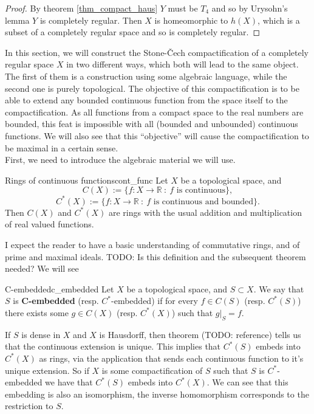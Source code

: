 \documentclass[a4paper]{book}
\theoremstyle{definition}
\theoremstyle{ejemplo}
\theoremstyle{demostracion}
\newcommand{\reales}{\mathbb{R}}
\begin{document}
\begin{proof}
	By theorem \eqref{thm_compact_haus} $Y$ must be $T_4$ and so by Urysohn's lemma $Y$ is completely regular. Then $X$ is homeomorphic to $h(X)$, which is a subset of a completely regular space and so is completely regular.
\end{proof}

In this section, we will construct the Stone-Čech compactification of a completely regular space $X$ in two different ways, which both will lead to the same object. The first of them is a construction using some algebraic language, while the second one is purely topological. The objective of this compactification is to be able to extend any bounded continuous function from the space itself to the compactification. As all functions from a compact space to the real numbers are bounded, this feat is impossible with all (bounded and unbounded) continuous functions. We will also see that this ``objective'' will cause the compactification to be maximal in a certain sense.\\ 
First, we need to introduce the algebraic material we will use.

\begin{define}{Rings of continuous functions}{cont_func}
	Let $X$ be a topological space, and 
	\begin{equation*}
		C(X) := \{ f: X \rightarrow \reales\ :\ f \text{ is continuous} \},
	\end{equation*}
	\begin{equation*}
		C^*(X) := \{ f: X \rightarrow \reales\ :\ f \text{ is continuous and bounded} \}.
	\end{equation*}
	Then $C(X)$ and $C^*(X)$ are rings with the usual addition and multiplication of real valued functions.
\end{define}

I expect the reader to have a basic understanding of commutative rings, and of prime and maximal ideals.
TODO: Is this definition and the subsequent theorem needed? We will see

\begin{define}{C-embedded}{c_embedded}
	Let $X$ be a topological space, and $S \subset X$. We say that $S$ is \textbf{C-embedded} (resp. $C^*$-embedded) if for every $f \in C(S)$ (resp. $C^*(S)$) there exists some $g \in C(X)$ (resp. $C^*(X)$) such that $g|_S = f$.
\end{define}

If $S$ is dense in $X$ and $X$ is Hausdorff, then theorem (TODO: reference) tells us that the continuous extension is unique. This implies that $C^*(S)$ embeds into $C^*(X)$ as rings, via the application that sends each continuous function to it's unique extension. So if $X$ is some compactification of $S$ such that $S$ is $C^*$-embedded we have that $C^*(S)$ embeds into $C^*(X)$. We can see that this embedding is also an isomorphism, the inverse homomorphism corresponds to the restriction to $S$.
\end{document}
